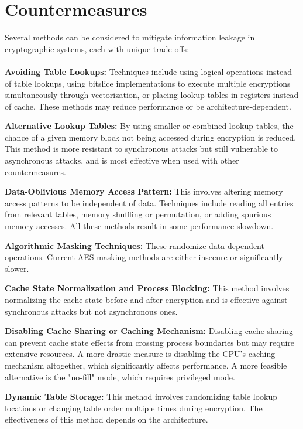 \section{Countermeasures}

Several methods can be considered to mitigate information leakage in cryptographic systems, each with unique trade-offs:

\paragraph{}
\textbf{Avoiding Table Lookups:} Techniques include using logical operations instead of table lookups, using bitslice implementations to execute multiple encryptions simultaneously through vectorization, or placing lookup tables in registers instead of cache. These methods may reduce performance or be architecture-dependent.

\textbf{Alternative Lookup Tables:} By using smaller or combined lookup tables, the chance of a given memory block not being accessed during encryption is reduced. This method is more resistant to synchronous attacks but still vulnerable to asynchronous attacks, and is most effective when used with other countermeasures.

\textbf{Data-Oblivious Memory Access Pattern:} This involves altering memory access patterns to be independent of data. Techniques include reading all entries from relevant tables, memory shuffling or permutation, or adding spurious memory accesses. All these methods result in some performance slowdown.

\textbf{Algorithmic Masking Techniques:} These randomize data-dependent operations. Current AES masking methods are either insecure or significantly slower.

\textbf{Cache State Normalization and Process Blocking:} This method involves normalizing the cache state before and after encryption and is effective against synchronous attacks but not asynchronous ones.

\textbf{Disabling Cache Sharing or Caching Mechanism:} Disabling cache sharing can prevent cache state effects from crossing process boundaries but may require extensive resources. A more drastic measure is disabling the CPU's caching mechanism altogether, which significantly affects performance. A more feasible alternative is the "no-fill" mode, which requires privileged mode.

\textbf{Dynamic Table Storage:} This method involves randomizing table lookup locations or changing table order multiple times during encryption. The effectiveness of this method depends on the architecture.

